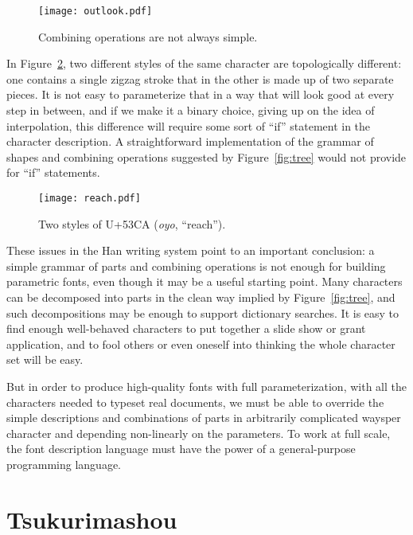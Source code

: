 \documentclass{ltugboat}
\begin{document}
\begin{figure}
\texttt{[image: outlook.pdf]}
\caption{Combining operations are not always simple.}
\label{fig:outlook}
\end{figure}

In Figure~\ref{fig:reach}, two different styles of the same character are
topologically different: one contains a single zigzag stroke that in the
other is made up of two separate pieces.  It is not easy to parameterize
that in a way that will look good at every step in between, and if we
make it a binary choice, giving up on the idea of interpolation, this
difference will require some sort of ``if'' statement in the character
description.  A straightforward implementation of the grammar of shapes and
combining operations suggested by Figure~\ref{fig:tree} would not provide
for ``if'' statements.

\begin{figure}
\texttt{[image: reach.pdf]}
\caption{Two styles of U+53CA (\emph{oyo}, ``reach'').}
\label{fig:reach}
\end{figure}

These issues in the Han writing system point to an important conclusion:  a
simple grammar of parts and combining operations is not enough for building
parametric fonts, even though it may be a useful starting point.  Many
characters can be decomposed into parts in the clean way implied by
Figure~\ref{fig:tree}, and such decompositions may be enough to support
dictionary searches.  It is easy to find enough well-behaved characters to
put together a slide show or grant application, and to fool others or even
oneself into thinking the whole character set will be easy.

But in order to produce high-quality fonts with full parameterization, with
all the characters needed to typeset real documents, we must be able to
override the simple descriptions and combinations of parts in arbitrarily
complicated ways\Dash per character and depending non-linearly on the
parameters.  To work at full scale, the font description language must have
the power of a general-purpose programming language.


\section{Tsukurimashou}
\end{document}
